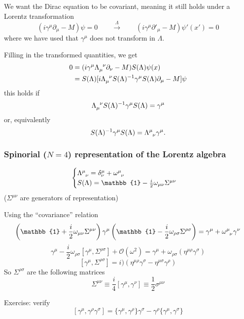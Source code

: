 We want the Dirac equation to be covariant, meaning it still holds under a Lorentz transformation
\[(i\gamma^\mu\partial_\mu - M)\psi = 0 \qquad \overset{\Lambda}{\rightarrow}\qquad (i\gamma^\mu\partial'_\mu - M)\psi'(x') = 0\]
where we have used that $\gamma^\mu$ does not transform in $\Lambda$.

Filling in the transformed quantities, we get
\begin{align*}
0 &= (i\gamma^\mu\tensor{\Lambda}{_\mu^\nu}\partial_\nu - M)S(\Lambda)\psi(x) \\
&= S(\Lambda)[i\tensor{\Lambda}{_\mu^\nu} S(\Lambda)^{-1}\gamma^\mu S(\Lambda) \partial_\mu - M]\psi \\
\end{align*}
this holds if
\[ \tensor{\Lambda}{_\mu^\nu} S(\Lambda)^{-1}\gamma^\mu S(\Lambda) = \gamma^\mu \]
or, equivalently
\[ S(\Lambda)^{-1}\gamma^\mu S(\Lambda) = \tensor{\Lambda}{^\mu_\nu}\gamma^\mu. \]

\subsubsection{Spinorial ($N=4$) representation of the Lorentz algebra}
\[ \begin{cases}
\tensor{\Lambda}{^\mu_\nu} = \delta^\mu_\nu + \tensor{\omega}{^\mu_\nu} \\
S(\Lambda) = \mathbb{1}- \frac{i}{2}\omega_{\mu\nu}\Sigma^{\mu\nu}
\end{cases} \]
($\Sigma^{\mu\nu}$ are generators of representation)

Using the ``covariance'' relation
\[ \left(\mathbb{1}+\frac{i}{2}\omega_{\mu\nu}\Sigma^{\mu\nu}\right)\gamma^\mu\left(\mathbb{1}-\frac{i}{2}\omega_{\rho\sigma}\Sigma^{\rho\sigma}\right) = \gamma^\mu + \tensor{\omega}{^\mu_\nu}\gamma^\nu \]
\[ \gamma^\mu - \frac{i}{2}\omega_{\rho\sigma}[\gamma^\mu,\Sigma^{\rho\sigma}] + \mathcal{O}(\omega^2) = \gamma^\mu + \omega_{\rho\sigma}(\eta^{\mu\rho}\gamma^\sigma) \]
\[ [\gamma^\mu, \Sigma^{\rho\sigma}] = i )(\eta^{\mu\rho}\gamma^\sigma - \eta^{\mu\sigma}\gamma^\rho) \]
So $\Sigma^{\rho\sigma}$ are the following matrices
\[ \Sigma^{\mu\nu} \equiv \frac{i}{4}[\gamma^\mu, \gamma^\nu] \equiv \frac{1}{2}\sigma^{\mu\nu} \]

\begin{example}
Exercise: verify
\[ [\gamma^\mu, \gamma^\rho\gamma^\sigma] = \{\gamma^\mu, \gamma^\rho\}\gamma^\sigma - \gamma^\rho\{\gamma^\mu, \gamma^\sigma\} \]
\end{example}

